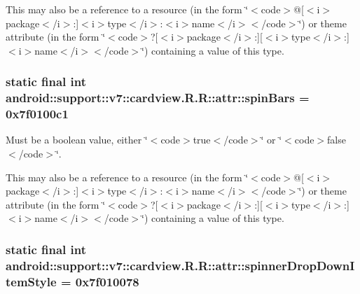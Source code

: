 This may also be a reference to a resource (in the form \char`\"{}$<$code$>$@\mbox{[}$<$i$>$package$<$/i$>$:\mbox{]}$<$i$>$type$<$/i$>$:$<$i$>$name$<$/i$>$$<$/code$>$\char`\"{}) or theme attribute (in the form \char`\"{}$<$code$>$?\mbox{[}$<$i$>$package$<$/i$>$:\mbox{]}\mbox{[}$<$i$>$type$<$/i$>$:\mbox{]}$<$i$>$name$<$/i$>$$<$/code$>$\char`\"{}) containing a value of this type. \hypertarget{classandroid_1_1support_1_1v7_1_1cardview_1_1_r_1_1attr_d09b19bafc878f86fc3eb5c0ea22158e}{
\subsubsection[{spinBars}]{\setlength{\rightskip}{0pt plus 5cm}static final int android::support::v7::cardview.R.R::attr::spinBars = 0x7f0100c1}}
\label{classandroid_1_1support_1_1v7_1_1cardview_1_1_r_1_1attr_d09b19bafc878f86fc3eb5c0ea22158e}


Must be a boolean value, either \char`\"{}$<$code$>$true$<$/code$>$\char`\"{} or \char`\"{}$<$code$>$false$<$/code$>$\char`\"{}. 

This may also be a reference to a resource (in the form \char`\"{}$<$code$>$@\mbox{[}$<$i$>$package$<$/i$>$:\mbox{]}$<$i$>$type$<$/i$>$:$<$i$>$name$<$/i$>$$<$/code$>$\char`\"{}) or theme attribute (in the form \char`\"{}$<$code$>$?\mbox{[}$<$i$>$package$<$/i$>$:\mbox{]}\mbox{[}$<$i$>$type$<$/i$>$:\mbox{]}$<$i$>$name$<$/i$>$$<$/code$>$\char`\"{}) containing a value of this type. \hypertarget{classandroid_1_1support_1_1v7_1_1cardview_1_1_r_1_1attr_42b9b956b4b9f5cebbb8f625fec43e01}{
\subsubsection[{spinnerDropDownItemStyle}]{\setlength{\rightskip}{0pt plus 5cm}static final int android::support::v7::cardview.R.R::attr::spinnerDropDownItemStyle = 0x7f010078}}
\label{classandroid_1_1support_1_1v7_1_1cardview_1_1_r_1_1attr_42b9b956b4b9f5cebbb8f625fec43e01}


